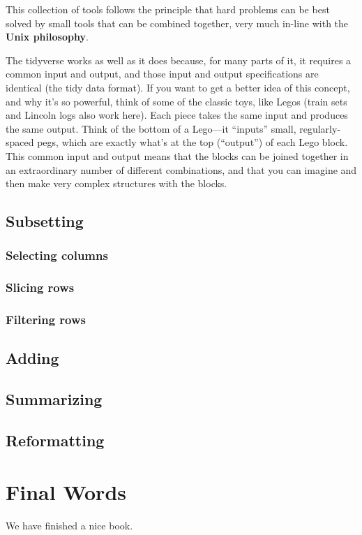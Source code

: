 \documentclass[]{tufte-book}
\begin{document}
This collection of tools follows the principle that hard problems can be best solved
by small tools that can be combined together, very much in-line with the \textbf{Unix
philosophy}.

The tidyverse works as well as it does because, for many parts of it, it requires
a common input and output, and those input and output specifications are
identical (the tidy data format).
If you want to get a better idea of this concept, and why it's so powerful,
think of some of the
classic toys, like Legos (train sets and Lincoln logs also
work here). Each piece takes the same input and produces the same output. Think of
the bottom of a Lego---it ``inputs'' small, regularly-spaced pegs, which are exactly
what's at the top (``output'') of each Lego block. This common input and output
means that the blocks can be joined together in an extraordinary number of
different combinations, and that you can imagine and then make very complex
structures with the blocks.

\hypertarget{subsetting}{%
\section{Subsetting}\label{subsetting}}

\hypertarget{selecting-columns}{%
\subsection{Selecting columns}\label{selecting-columns}}

\hypertarget{slicing-rows}{%
\subsection{Slicing rows}\label{slicing-rows}}

\hypertarget{filtering-rows}{%
\subsection{Filtering rows}\label{filtering-rows}}

\hypertarget{adding}{%
\section{Adding}\label{adding}}

\hypertarget{summarizing}{%
\section{Summarizing}\label{summarizing}}

\hypertarget{reformatting}{%
\section{Reformatting}\label{reformatting}}

\hypertarget{final-words}{%
\chapter{Final Words}\label{final-words}}

We have finished a nice book.


\end{document}
